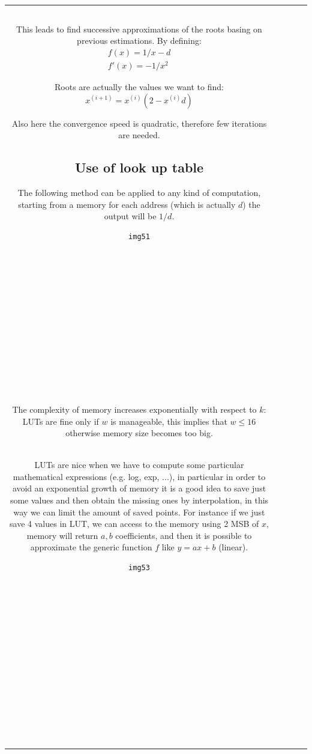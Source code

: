 \begin{center}
\begin{tabular}{|c|c|c|c|c|}
\begin{verbatim}
\end{verbatim}

This leads to find successive approximations of the roots basing on previous estimations. By defining:
\begin{eqnarray}
f(x)=1/x -d \\
f'(x)=-1/x^2
\end{eqnarray}

Roots are actually the values we want to find:
$$x^{(i+1)}=x^{(i)}(2-x^{(i)}d)$$

Also here the convergence speed is quadratic, therefore few iterations are needed.

\subsection{Use of look up table}
The following method can be applied to any kind of computation, starting from a memory for each address (which is actually $d$) the output will be $1/d$.

\begin{verbatim}
img51














\end{verbatim}

The complexity of memory increases exponentially with respect to $k$: LUTs are fine only if $w$ is manageable, this implies that $w \leq 16$ otherwise memory size becomes too big.\\

LUTs are nice when we have to compute some particular mathematical expressions (e.g. log, exp, ...), in particular in order to avoid an exponential growth of memory it is a good idea to save just some values and then obtain the missing ones by interpolation, in this way we can limit the amount of saved points. For instance if we just save 4 values in LUT, we can access to the memory using 2 MSB of $x$, memory will return $a,b$ coefficients, and then it is possible to approximate the generic function $f$ like $y=ax+b$ (linear).

\begin{verbatim}
img53















\end{verbatim}
\end{tabular}
\end{center}
